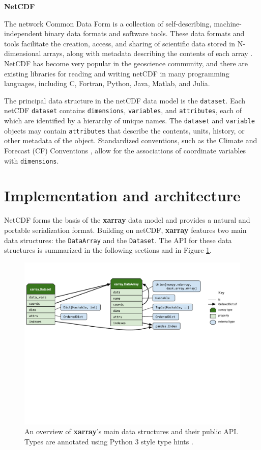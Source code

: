 \documentclass{jors}
\begin{document}
\textbf{NetCDF}

The network Common Data Form is a collection of self-describing, machine-independent binary data formats and software tools.
These data formats and tools facilitate the creation, access, and sharing of scientific data stored in N-dimensional arrays, along with metadata describing the contents of each array \citep{Rew_1990}.
NetCDF has become very popular in the geoscience community, and there are existing libraries for reading and writing netCDF in many programming languages, including C, Fortran, Python, Java, Matlab, and Julia.

The principal data structure in the netCDF data model is the \verb|dataset|.
Each netCDF \verb|dataset| contains \verb|dimensions|, \verb|variables|, and \verb|attributes|, each of which are identified by a hierarchy of unique names.
The \verb|dataset| and \verb|variable| objects may contain \verb|attributes| that describe the contents, units, history, or other metadata of the object.
Standardized conventions, such as the Climate and Forecast (CF) Conventions \citep{eaton2003netcdf}, allow for the associations of coordinate variables with \verb|dimensions|.

\section*{Implementation and architecture}

NetCDF forms the basis of the \textbf{xarray} data model and provides a natural and portable serialization format.
Building on netCDF, \textbf{xarray} features two main data structures: the \verb|DataArray| and the \verb|Dataset|.
The API for these data structures is summarized in the following sections and in Figure \ref{fig:xarray-public-api}.

\begin{figure}
	\centering
	\includegraphics[width=\textwidth]{xarray-public-api}
	\caption{An overview of \textbf{xarray}'s main data structures and their public API. Types are annotated using Python 3 style type hints \cite{pep484}.}
	\label{fig:xarray-public-api}
\end{figure}
\end{document}
